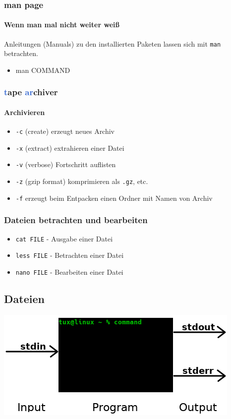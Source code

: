 \documentclass[12pt,utf8]{beamer}
\begin{document}
\begin{frame}
\frametitle{man page}
\framesubtitle{Wenn man mal nicht weiter weiß}
Anleitungen (Manuals) zu den installierten Paketen lassen sich mit \texttt{man} betrachten.
\begin{itemize}
	\item man COMMAND
\end{itemize}
\end{frame}

\begin{frame}
\frametitle{\textcolor{highlight}{t}ape \textcolor{highlight}{ar}chiver}
\framesubtitle{Archivieren}
\begin{itemize}[<+->]
\item {\scriptsize \texttt{-c} (create) erzeugt neues Archiv}
\item {\scriptsize \texttt{-x} (extract) extrahieren einer Datei}
\item {\scriptsize \texttt{-v} (verbose) Fortschritt auflisten}
\item {\scriptsize \texttt{-z} (gzip format) komprimieren als \texttt{.gz}, etc.}
\item {\scriptsize \texttt{-f} erzeugt beim Entpacken einen Ordner mit Namen von Archiv}
\end{itemize}
\end{frame}

\begin{frame}
\frametitle{\Large Dateien betrachten und bearbeiten}
\begin{itemize}
	\item \texttt{cat FILE} - Ausgabe einer Datei
	\item \texttt{less FILE} - Betrachten einer Datei
	\item \texttt{nano FILE} - Bearbeiten einer Datei
\end{itemize}
\end{frame}

\subsection{Dateien}
\begin{frame}
	\centering\includegraphics[scale=0.65]{res/IOE}
\end{frame}
\end{document}
